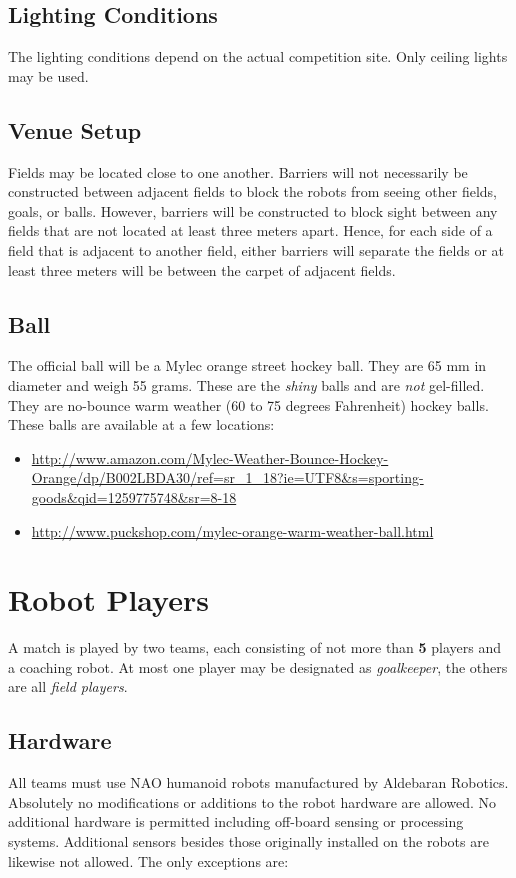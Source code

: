 \documentclass[12pt]{article}
\begin{document}
\subsection{Lighting Conditions}

The lighting conditions depend on the actual competition site. Only ceiling lights may be used.

\subsection{Venue Setup}
\label{sec:boundaries}
Fields may be located close to one another.  Barriers will not necessarily be constructed between adjacent fields to block the robots from seeing other fields, goals, or balls.  However, barriers will be constructed to block sight between any fields that are not located at least three meters apart.  Hence, for each side of a field that is adjacent to another field, either barriers will separate the fields or at least three meters will be between the carpet of adjacent fields.

\subsection{Ball}
\label{sec:ball}

The official ball will be a Mylec orange street hockey ball. They are 65 mm in diameter and weigh 55 grams. These are the \emph{shiny} balls and are \emph{not} gel-filled.  They are no-bounce warm weather (60 to 75 degrees Fahrenheit) hockey balls.  These balls are available at a few locations:
\begin{itemize}
\item \url{http://www.amazon.com/Mylec-Weather-Bounce-Hockey-Orange/dp/B002LBDA30/ref=sr\_1\_18?ie=UTF8\&s=sporting-goods\&qid=1259775748\&sr=8-18}
\item \url{http://www.puckshop.com/mylec-orange-warm-weather-ball.html}
\end{itemize}


\section{Robot Players}
\label{sec:robot_players}
A match is played by two teams, each consisting of not more than \textbf{5} players and a coaching robot. At most one player may be designated as \emph{goalkeeper}, the others are all \emph{field players}.

\subsection{Hardware}
\label{sec:hardware}
All teams must use NAO humanoid robots manufactured by Aldebaran Robotics. Absolutely no modifications or additions to the robot hardware are allowed. No additional hardware is permitted including off-board sensing or processing systems. Additional sensors besides those originally installed on the robots are likewise not allowed. The only exceptions are:
\end{document}
